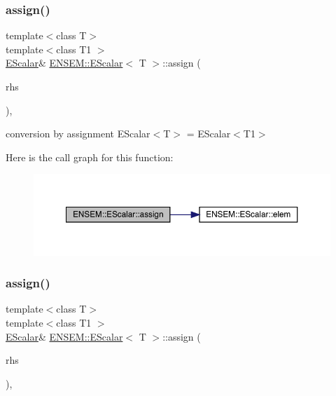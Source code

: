 \subsubsection{\texorpdfstring{assign()}{assign()}\hspace{0.1cm}{\footnotesize\ttfamily [5/6]}}
{\footnotesize\ttfamily template$<$class T$>$ \\
template$<$class T1 $>$ \\
\mbox{\hyperlink{classENSEM_1_1EScalar}{E\+Scalar}}\& \mbox{\hyperlink{classENSEM_1_1EScalar}{E\+N\+S\+E\+M\+::\+E\+Scalar}}$<$ T $>$\+::assign (\begin{DoxyParamCaption}\item[{const \mbox{\hyperlink{classENSEM_1_1EScalar}{E\+Scalar}}$<$ T1 $>$ \&}]{rhs }\end{DoxyParamCaption})\hspace{0.3cm}{\ttfamily [inline]}, {\ttfamily [protected]}}



conversion by assignment E\+Scalar$<$\+T$>$ = E\+Scalar$<$\+T1$>$ 

Here is the call graph for this function\+:
\nopagebreak
\begin{figure}[H]
\begin{center}
\leavevmode
\includegraphics[width=350pt]{d0/d82/classENSEM_1_1EScalar_aa9a54e03830d13eb6a124c64c6a46dd1_cgraph}
\end{center}
\end{figure}
\mbox{\label{classENSEM_1_1EScalar_aa9a54e03830d13eb6a124c64c6a46dd1}} 
\subsubsection{\texorpdfstring{assign()}{assign()}\hspace{0.1cm}{\footnotesize\ttfamily [6/6]}}
{\footnotesize\ttfamily template$<$class T$>$ \\
template$<$class T1 $>$ \\
\mbox{\hyperlink{classENSEM_1_1EScalar}{E\+Scalar}}\& \mbox{\hyperlink{classENSEM_1_1EScalar}{E\+N\+S\+E\+M\+::\+E\+Scalar}}$<$ T $>$\+::assign (\begin{DoxyParamCaption}\item[{const \mbox{\hyperlink{classENSEM_1_1EScalar}{E\+Scalar}}$<$ T1 $>$ \&}]{rhs }\end{DoxyParamCaption})\hspace{0.3cm}{\ttfamily [inline]}, {\ttfamily [protected]}}



